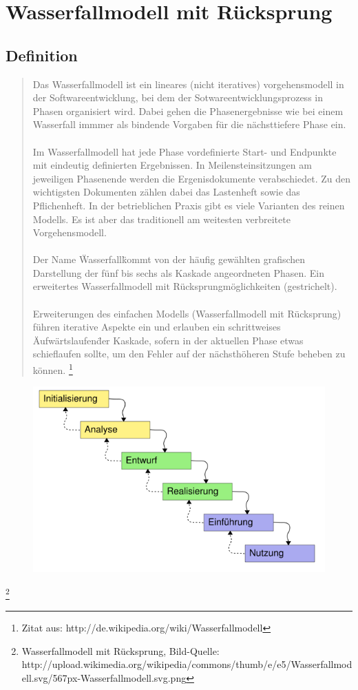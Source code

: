 \chapter{Wasserfallmodell mit Rücksprung}
\section{Definition}
\begin{quote}
Das Wasserfallmodell ist ein lineares (nicht iteratives) vorgehensmodell in der Softwareentwicklung, bei dem der
 Sotwareentwicklungsprozess in Phasen organisiert wird. Dabei gehen die Phasenergebnisse wie bei einem Wasserfall immmer
als bindende Vorgaben für die nächsttiefere Phase ein.\ \\ \\
Im Wasserfallmodell hat jede Phase vordefinierte Start- und Endpunkte mit eindeutig definierten Ergebnissen.
In Meilensteinsitzungen am jeweiligen Phasenende werden die Ergenisdokumente verabschiedet. Zu den wichtigsten
Dokumenten zählen dabei das Lastenheft sowie das Pflichenheft. In der betrieblichen Praxis gibt es viele Varianten
des reinen Modells. Es ist aber das traditionell am weitesten verbreitete Vorgehensmodell.\ \\ \\
Der Name \"Wasserfall\" kommt von der häufig gewählten grafischen Darstellung der fünf bis sechs als Kaskade
angeordneten Phasen. Ein erweitertes Wasserfallmodell mit Rücksprungmöglichkeiten (gestrichelt).\ \\ \\
Erweiterungen des einfachen Modells (Wasserfallmodell mit Rücksprung) führen iterative Aspekte ein und erlauben
ein schrittweises \"Aufwärtslaufen\" der Kaskade, sofern in der aktuellen Phase etwas schieflaufen sollte,
um den Fehler auf der nächsthöheren Stufe beheben zu können.
\footnote{Zitat aus:  http://de.wikipedia.org/wiki/Wasserfallmodell}
\end{quote}
\begin{figure}[h]
\centering
\includegraphics[scale=0.35]{567px-Wasserfallmodell.png}
\end{figure}
\footnote{Wasserfallmodell mit Rücksprung, Bild-Quelle: http://upload.wikimedia.org/wikipedia/commons/thumb/e/e5/Wasserfallmodell.svg/567px-Wasserfallmodell.svg.png}
